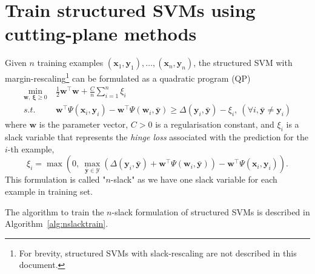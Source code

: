 \documentclass[9pt]{extarticle}
\newcommand{\eat}[1]{}
\begin{document}
\eat{citation}



\section{Train structured SVMs using cutting-plane methods}
\label{sec:ssvm}

Given $n$ training examples $(\mathbf{x}_1, \mathbf{y}_1), \dots, (\mathbf{x}_n, \mathbf{y}_n)$, 
the structured SVM with margin-rescaling\footnote{For brevity, structured SVMs with slack-rescaling are not described in this document.}
can be formulated as a quadratic program (QP)
\begin{equation}
\label{eq:nslackform}
\begin{aligned}
\min_{\mathbf{w}, ~\bm{\xi} \ge 0} ~& \frac{1}{2} \mathbf{w}^\top \mathbf{w} + \frac{C}{n} \sum_{i=1}^n \xi_i \\
s.t.~~ ~& \mathbf{w}^\top \Psi(\mathbf{x}_i, \mathbf{y}_i) - \mathbf{w}^\top \Psi(\mathbf{w}_i, \bar{\mathbf{y}}) \ge 
       \Delta(\mathbf{y}_i, \bar{\mathbf{y}}) - \xi_i, ~(\forall i, \bar{\mathbf{y}} \neq \mathbf{y}_i)
\end{aligned}
\end{equation}
where $\mathbf{w}$ is the parameter vector, $C > 0$ is a regularisation constant, and $\xi_i$
is a slack variable that represents the \emph{hinge loss} associated with the prediction for the $i$-th example,
\begin{equation*}
\xi_i = \max \left( 0,~ 
        \max_{\bar{\mathbf{y}} \in \mathcal{Y}} \left( \Delta(\mathbf{y}_i, \bar{\mathbf{y}}) + \mathbf{w}^\top \Psi(\mathbf{w}_i, \bar{\mathbf{y}}) \right) -
        \mathbf{w}^\top \Psi(\mathbf{x}_i, \mathbf{y}_i) \right).
\end{equation*}
This formulation is called "$n$-slack" as we have one slack variable for each example in training set. \eat{citation}

The algorithm to train the $n$-slack formulation of structured SVMs is described in Algorithm~\ref{alg:nslacktrain}.
\end{document}
